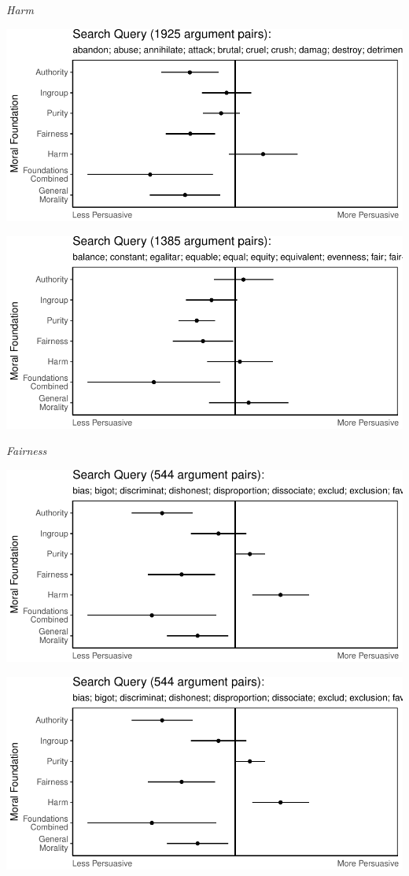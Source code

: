 \documentclass[11pt,]{article}
\begin{document}
\emph{Harm}

\includegraphics{prelim_files/figure-latex/unnamed-chunk-11-1.pdf}

\includegraphics{prelim_files/figure-latex/unnamed-chunk-12-1.pdf}

\emph{Fairness}

\includegraphics{prelim_files/figure-latex/unnamed-chunk-13-1.pdf}

\includegraphics{prelim_files/figure-latex/unnamed-chunk-14-1.pdf}
\end{document}
